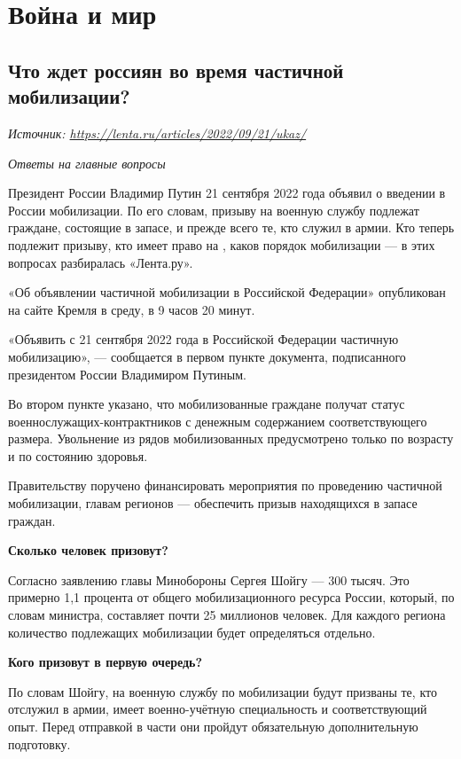 \chapter{Война и мир}

\section{Что ждет россиян во время частичной мобилизации?}
\textit{Источник: \url{https://lenta.ru/articles/2022/09/21/ukaz/}}

\textit{Ответы на главные вопросы}

Президент России Владимир Путин 21 сентября 2022 года объявил о введении в России  мобилизации. По его словам, призыву на военную службу подлежат граждане, состоящие в запасе, и прежде всего те, кто служил в армии. Кто теперь подлежит призыву, кто имеет право на , каков порядок мобилизации — в этих вопросах разбиралась «Лента.ру».

 «Об объявлении частичной мобилизации в Российской Федерации» опубликован на сайте Кремля в среду, в 9 часов 20 минут.

«Объявить с 21 сентября 2022 года в Российской Федерации частичную мобилизацию», — сообщается в первом пункте документа, подписанного президентом России Владимиром Путиным.

Во втором пункте указано, что мобилизованные граждане получат статус военнослужащих-контрактников с денежным содержанием соответствующего размера. Увольнение из рядов мобилизованных предусмотрено только по возрасту и по состоянию здоровья.

Правительству поручено финансировать мероприятия по проведению частичной мобилизации, главам регионов — обеспечить призыв находящихся в запасе граждан.

\textbf{Сколько человек призовут?}

Согласно заявлению главы Минобороны Сергея Шойгу — 300 тысяч. Это примерно 1,1 процента от общего мобилизационного ресурса России, который, по словам министра, составляет почти 25 миллионов человек. Для каждого региона количество подлежащих мобилизации будет определяться отдельно.

\textbf{Кого призовут в первую очередь?}

По словам Шойгу, на военную службу по мобилизации будут призваны те, кто отслужил в армии, имеет военно-учётную специальность и соответствующий опыт. Перед отправкой в части они пройдут обязательную дополнительную подготовку.

